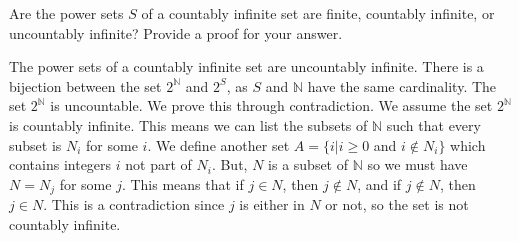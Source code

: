 \question Are the power sets $S$ of a countably infinite set are finite, countably infinite, or uncountably infinite? Provide a proof for your answer. 

\begin{solution} [1 in]
The power sets of a countably infinite set are uncountably infinite. There is a bijection between the set $2^\mathbb{N}$ and $2^S$, as $S$ and $\mathbb{N}$ have the same cardinality. The set $2^\mathbb{N}$ is uncountable. We prove this through contradiction. We assume the set $2^\mathbb{N}$ is countably infinite. This means we can list the subsets of $\mathbb{N}$ such that every subset is $N_i$ for some $i$. We define another set $A = \{i | i \geq 0$ and $i \notin N_i\}$ which contains integers $i$ not part of $N_i$. But, $N$ is a subset of $\mathbb{N}$ so we must have $N = N_j$ for some $j$. This means that if $j \in N$, then $j \notin N$, and if $j \notin N$, then $j \in N$. This is a contradiction since $j$ is either in $N$ or not, so the set is not countably infinite.  
\end{solution}
